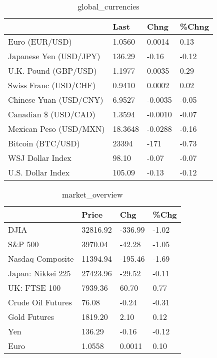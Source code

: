 \documentclass{article}%
\begin{document}
%


\begin{table}[htbp]%
\caption{global\_currencies}%
\centering%
\begin{adjustbox}{width=1\textwidth}%
\begin{tabular}{llll}
\toprule
                       &    Last &    Chng & \%Chng \\
\midrule
        Euro (EUR/USD) &  1.0560 &  0.0014 &  0.13 \\
Japanese Yen (USD/JPY) &  136.29 &   -0.16 & -0.12 \\
  U.K. Pound (GBP/USD) &  1.1977 &  0.0035 &  0.29 \\
 Swiss Franc (USD/CHF) &  0.9410 &  0.0002 &  0.02 \\
Chinese Yuan (USD/CNY) &  6.9527 & -0.0035 & -0.05 \\
  Canadian \$ (USD/CAD) &  1.3594 & -0.0010 & -0.07 \\
Mexican Peso (USD/MXN) & 18.3648 & -0.0288 & -0.16 \\
     Bitcoin (BTC/USD) &   23394 &    -171 & -0.73 \\
      WSJ Dollar Index &   98.10 &   -0.07 & -0.07 \\
     U.S. Dollar Index &  105.09 &   -0.13 & -0.12 \\
\bottomrule
\end{tabular}
%
\end{adjustbox}%
\end{table}

%


\begin{table}[htbp]%
\caption{market\_overview}%
\centering%
\begin{adjustbox}{width=1\textwidth}%
\begin{tabular}{llll}
\toprule
                  &    Price &     Chg &  \%Chg \\
\midrule
             DJIA & 32816.92 & -336.99 & -1.02 \\
          S\&P 500 &  3970.04 &  -42.28 & -1.05 \\
 Nasdaq Composite & 11394.94 & -195.46 & -1.69 \\
Japan: Nikkei 225 & 27423.96 &  -29.52 & -0.11 \\
     UK: FTSE 100 &  7939.36 &   60.70 &  0.77 \\
Crude Oil Futures &    76.08 &   -0.24 & -0.31 \\
     Gold Futures &  1819.20 &    2.10 &  0.12 \\
              Yen &   136.29 &   -0.16 & -0.12 \\
             Euro &   1.0558 &  0.0011 &  0.10 \\
\bottomrule
\end{tabular}
%
\end{adjustbox}%
\end{table}

%
\end{document}
